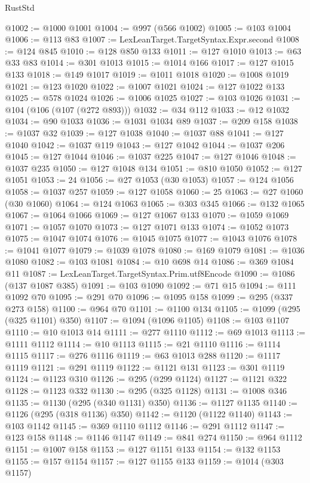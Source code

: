 \begin{lexlean}{RustStd}
\begin{coremodule}
@1002 := @1000 @1001
@1004 := @997 (@566 @1002)
@1005 := @103 @1004
@1006 := @113 @83
@1007 := LexLeanTarget.TargetSyntax.Expr.second
@1008 := @124 @845
@1010 := @128 @850 @133
@1011 := @127 @1010
@1013 := @63 @33 @83
@1014 := @301 @1013
@1015 := @1014 @166
@1017 := @127 @1015 @133
@1018 := @149 @1017
@1019 := @1011 @1018
@1020 := @1008 @1019
@1021 := @123 @1020
@1022 := @1007 @1021
@1024 := @127 @1022 @133
@1025 := @578 @1024
@1026 := @1006 @1025
@1027 := @103 @1026
@1031 := @104 (@106 (@107 (@272 @893)))
@1032 := @34 @112
@1033 := @12 @1032
@1034 := @90 @1033
@1036 := @1031 @1034 @89
@1037 := @209 @158
@1038 := @1037 @32
@1039 := @127 @1038
@1040 := @1037 @88
@1041 := @127 @1040
@1042 := @1037 @119
@1043 := @127 @1042
@1044 := @1037 @206
@1045 := @127 @1044
@1046 := @1037 @225
@1047 := @127 @1046
@1048 := @1037 @235
@1050 := @127 @1048 @134
@1051 := @810 @1050
@1052 := @127 @1051
@1053 := 24
@1056 := @27 @1053 (@30 @1053)
@1057 := @124 @1056
@1058 := @1037 @257
@1059 := @127 @1058
@1060 := 25
@1063 := @27 @1060 (@30 @1060)
@1064 := @124 @1063
@1065 := @303 @345
@1066 := @132 @1065
@1067 := @1064 @1066
@1069 := @127 @1067 @133
@1070 := @1059 @1069
@1071 := @1057 @1070
@1073 := @127 @1071 @133
@1074 := @1052 @1073
@1075 := @1047 @1074
@1076 := @1045 @1075
@1077 := @1043 @1076
@1078 := @1041 @1077
@1079 := @1039 @1078
@1080 := @169 @1079
@1081 := @1036 @1080
@1082 := @103 @1081
@1084 := @10 @698 @14
@1086 := @369 @1084 @11
@1087 := LexLeanTarget.TargetSyntax.Prim.utf8Encode
@1090 := @1086 (@137 @1087 @385)
@1091 := @103 @1090
@1092 := @71 @15
@1094 := @111 @1092 @70
@1095 := @291 @70
@1096 := @1095 @158
@1099 := @295 (@337 @273 @158)
@1100 := @964 @70
@1101 := @1100 @134
@1105 := @1099 (@295 (@325 @1101) @350)
@1107 := @1094 (@1096 @1105)
@1108 := @103 @1107
@1110 := @10 @1013 @14
@1111 := @277 @1110
@1112 := @69 @1013
@1113 := @1111 @1112
@1114 := @10 @1113
@1115 := @21 @1110
@1116 := @1114 @1115
@1117 := @276 @1116
@1119 := @63 @1013 @288
@1120 := @1117 @1119
@1121 := @291 @1119
@1122 := @1121 @131
@1123 := @301 @1119
@1124 := @1123 @310
@1126 := @295 (@299 @1124)
@1127 := @1121 @322
@1128 := @1123 @332
@1130 := @295 (@325 @1128)
@1131 := @1008 @346
@1135 := @1130 (@295 (@340 @1131) @350)
@1136 := @1127 @1135
@1140 := @1126 (@295 (@318 @1136) @350)
@1142 := @1120 (@1122 @1140)
@1143 := @103 @1142
@1145 := @369 @1110 @1112
@1146 := @291 @1112
@1147 := @123 @158
@1148 := @1146 @1147
@1149 := @841 @274
@1150 := @964 @1112
@1151 := @1007 @158
@1153 := @127 @1151 @133
@1154 := @132 @1153
@1155 := @157 @1154
@1157 := @127 @1155 @133
@1159 := @1014 (@303 @1157)

\end{coremodule}
\end{lexlean}
